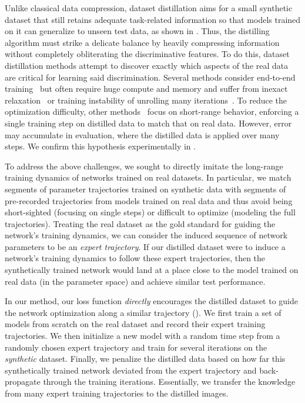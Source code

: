 Unlike classical data compression, dataset distillation aims for a small synthetic dataset that still retains adequate task-related information so that models trained on it can generalize to unseen test data, as shown in . Thus, the distilling algorithm must strike a delicate balance by heavily compressing information without completely obliterating the discriminative features.  
To do this, dataset distillation methods attempt to discover exactly which aspects of the real data are critical for learning said discrimination. Several methods consider end-to-end training~\cite{dd,nguyen2020dataset,nguyen2021dataset} but often require huge compute and memory and suffer from inexact relaxation~\cite{nguyen2020dataset,nguyen2021dataset} or training instability of unrolling many iterations~\cite{dd,maclaurin2015gradient}. To reduce the optimization difficulty, other methods~\cite{dc,dsa} focus on short-range behavior, enforcing a single training step on distilled data to match that on real data. However, error may accumulate in evaluation, where the distilled data is applied over many steps. We confirm this hypothesis experimentally in .


To address the above challenges, we sought to directly imitate the long-range training dynamics of networks trained on real datasets. In particular, we match segments of parameter trajectories trained on synthetic data with segments of pre-recorded trajectories from models trained on real data and thus avoid being short-sighted (\ie focusing on single steps) or difficult to optimize (\ie modeling the full trajectories). 
Treating the real dataset as the gold standard for guiding the network's training dynamics, we can consider the induced sequence of network parameters to be an \emph{expert trajectory}. If our distilled dataset were to induce a network's training dynamics to follow these expert trajectories, then the synthetically trained network would land at a place close to the model trained on real data (in the parameter space) and achieve similar test performance. %




In our method, our loss function \textit{directly} encourages the distilled dataset to guide the network optimization along a similar trajectory (). We first train a set of models from scratch on the real dataset and record their expert training trajectories. We then initialize a new model with a random time step from a randomly chosen expert trajectory and train for several iterations on the \textit{synthetic} dataset. Finally, we penalize the distilled data based on how far this synthetically trained network deviated from the expert trajectory and back-propagate through the training iterations. Essentially, we transfer the knowledge from many expert training trajectories to the distilled images. 

